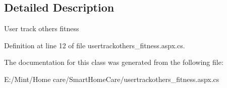 \subsection{Detailed Description}
User track others fitness 

Definition at line 12 of file usertrackothers\-\_\-fitness.\-aspx.\-cs.



The documentation for this class was generated from the following file\-:\begin{DoxyCompactItemize}
\item 
E\-:/\-Mint/\-Home care/\-Smart\-Home\-Care/usertrackothers\-\_\-fitness.\-aspx.\-cs\end{DoxyCompactItemize}
